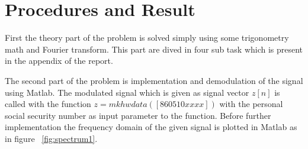 \documentclass[a4paper,twocolumn]{article}
\begin{document}
\section{Procedures and Result}
\label{sec:praktik}

First the theory part of the problem is solved simply using some trigonometry math and Fourier transform. This part are dived in four sub task which is present in the appendix of the report.

\noindent
The second part of the problem is implementation and demodulation of the signal using Matlab.
The modulated signal which is given as signal vector $z[n]$ is called with the function $z = mkhwdata([860510xxxx])$ with the personal social security number as input parameter to the function. Before further implementation the frequency domain of the given signal is plotted in Matlab as in figure ~\ref{fig:spectrum1}.
\end{document}
